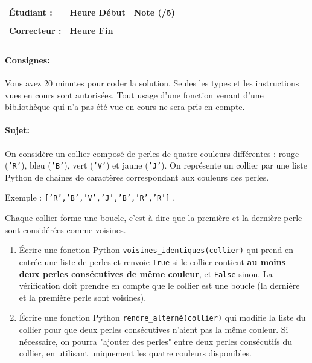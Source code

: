 \documentclass[a4paper,11pt]{article}
\begin{document}
\vspace{-0.3 cm}

\begin{table}[h!]
\centering
\renewcommand{\arraystretch}{1.4} %
\begin{tabular}{|p{10cm}|p{3cm}|p{2cm}|}
\hline
\textbf{Étudiant :} & \textbf{Heure Début }  & \textbf{Note (/5) }  \\
& & \\
\hline
\textbf{Correcteur :} & \textbf{Heure Fin } & \\
& & \\
\hline

\hline
\end{tabular}
\end{table}
\vspace{-0.4 cm}
\paragraph*{Consignes:} Vous avez 20 minutes pour coder la solution. Seules les types et les instructions vues en cours sont autorisées. Tout usage d'une fonction 
venant d'une bibliothèque qui n'a pas été vue en cours ne sera pris en compte. 

\vspace{-0.2 cm}
\paragraph*{Sujet:}


On considère un collier composé de perles de quatre couleurs différentes : rouge (\texttt{'R'}), bleu (\texttt{'B'}), vert (\texttt{'V'}) et jaune (\texttt{'J'}).  
On représente un collier par une liste Python de chaînes de caractères correspondant aux couleurs des perles. 

\vspace{0.2 cm}
 Exemple :  \texttt{['R','B','V','J','B','R','R']} . 
\vspace{0.2 cm}


Chaque collier forme une boucle, c’est-à-dire que la première et la dernière perle sont considérées comme voisines.  

\bigskip

\begin{enumerate}
  \item[1.] Écrire une fonction Python \texttt{voisines\_identiques(collier)} qui prend en entrée une liste de perles et renvoie \texttt{True} si le collier contient \textbf{au moins deux perles consécutives de même couleur}, et \texttt{False} sinon.  
  La vérification doit prendre en compte que le collier est une boucle (la dernière et la première perle sont voisines).

  \item[2.] Écrire une fonction Python \texttt{rendre\_alterné(collier)} qui modifie la liste du collier pour que deux perles consécutives n’aient pas  la même couleur.  
  Si nécessaire, on pourra "ajouter des perles" entre deux perles consécutifs du collier, en utilisant uniquement les quatre couleurs disponibles.
\end{enumerate}
\end{document}
